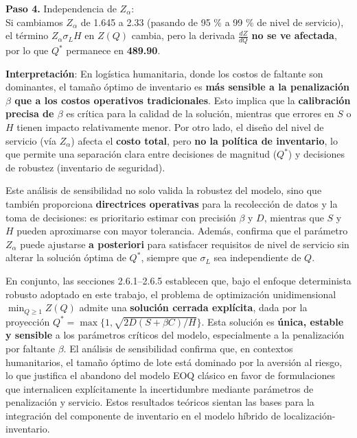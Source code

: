 \documentclass[
  spanish,
  us-letterpaper,
  DIV=11,
  numbers=noendperiod]{scrreprt}
\numberwithin{equation}{section}
\begin{document}
\textbf{Paso 4.} Independencia de \(Z_\alpha\):\\
Si cambiamos \(Z_\alpha\) de 1.645 a 2.33 (pasando de 95 \% a 99 \% de
nivel de servicio), el término \(Z_\alpha \sigma_L H\) en \(Z(Q)\)
cambia, pero la derivada \(\frac{dZ}{dQ}\) \textbf{no se ve afectada},
por lo que \(Q^*\) permanece en \textbf{489.90}.

\textbf{Interpretación}: En logística humanitaria, donde los costos de
faltante son dominantes, el tamaño óptimo de inventario es \textbf{más
sensible a la penalización \(\beta\) que a los costos operativos
tradicionales}. Esto implica que la \textbf{calibración precisa de
\(\beta\)} es crítica para la calidad de la solución, mientras que
errores en \(S\) o \(H\) tienen impacto relativamente menor. Por otro
lado, el diseño del nivel de servicio (vía \(Z_\alpha\)) afecta el
\textbf{costo total}, pero \textbf{no la política de inventario}, lo que
permite una separación clara entre decisiones de magnitud (\(Q^*\)) y
decisiones de robustez (inventario de seguridad).

Este análisis de sensibilidad no solo valida la robustez del modelo,
sino que también proporciona \textbf{directrices operativas} para la
recolección de datos y la toma de decisiones: es prioritario estimar con
precisión \(\beta\) y \(D\), mientras que \(S\) y \(H\) pueden
aproximarse con mayor tolerancia. Además, confirma que el parámetro
\(Z_\alpha\) puede ajustarse \textbf{a posteriori} para satisfacer
requisitos de nivel de servicio sin alterar la solución óptima de
\(Q^*\), siempre que \(\sigma_L\) sea independiente de \(Q\).

En conjunto, las secciones 2.6.1--2.6.5 establecen que, bajo el enfoque
determinista robusto adoptado en este trabajo, el problema de
optimización unidimensional \(\min_{Q \geq 1} Z(Q)\) admite una
\textbf{solución cerrada explícita}, dada por la proyección
\(Q^* = \max\{1, \sqrt{2D(S + \beta C)/H}\}\). Esta solución es
\textbf{única, estable y sensible} a los parámetros críticos del modelo,
especialmente a la penalización por faltante \(\beta\). El análisis de
sensibilidad confirma que, en contextos humanitarios, el tamaño óptimo
de lote está dominado por la aversión al riesgo, lo que justifica el
abandono del modelo EOQ clásico en favor de formulaciones que
internalicen explícitamente la incertidumbre mediante parámetros de
penalización y servicio. Estos resultados teóricos sientan las bases
para la integración del componente de inventario en el modelo híbrido de
localización-inventario.
\end{document}
